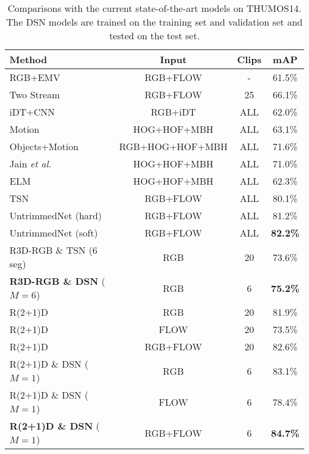 \documentclass[journal]{IEEEtran}
\begin{document}
\begin{table*}[t]
\centering
\caption{Comparisons with the current state-of-the-art models on THUMOS14. The DSN models are trained on the training set and validation set and tested on the test set.}
\begin{tabular}{l|c|c|c}
\toprule[2pt]
Method &Input &Clips& mAP \\
\hline
RGB+EMV~\cite{ZhangWW0W16}&RGB+FLOW&-& 61.5\%\\
Two Stream~\cite{SimonyanZ14}&RGB+FLOW&25& 66.1\%\\
iDT+CNN~\cite{wang2014action}&RGB+iDT&ALL&62.0\%\\
Motion~\cite{JainGS15} &HOG+HOF+MBH&ALL& 63.1\% \\
Objects+Motion~\cite{JainGS15} &RGB+HOG+HOF+MBH&ALL& 71.6\% \\
Jain \emph{et al.}~\cite{jain2014university}&HOG+HOF+MBH&ALL& 71.0\% \\
ELM~\cite{varol2014extreme} &HOG+HOF+MBH&ALL& 62.3\%\\
TSN~\cite{TSN-J}&RGB+FLOW&ALL& 80.1\%\\
UntrimmedNet (hard)~\cite{WangXLG17}  &RGB+FLOW&ALL& 81.2\%\\
UntrimmedNet (soft)~\cite{WangXLG17} &RGB+FLOW&ALL&\textbf{82.2\%}\\
\hline
R3D-RGB \& TSN (6 seg)~ &RGB& 20 & 73.6\%\\
\textbf{R3D-RGB \& DSN} ($M=6$)~ &RGB& 6&\textbf{75.2\%} \\
\hline
R(2+1)D&RGB&20& 81.9\%\\
R(2+1)D&FLOW&20& 73.5\%\\
R(2+1)D&RGB+FLOW&20& 82.6\%\\
R(2+1)D \& DSN ($M=1$)~ &RGB&6& 83.1\% \\
R(2+1)D \& DSN ($M=1$)~ &FLOW&6& 78.4\% \\
\textbf{R(2+1)D \& DSN} ($M=1$)~ &RGB+FLOW&6& \textbf{84.7\%} \\

\bottomrule[2pt]
\end{tabular}
\label{tab:state_of_the_art_thumos}
\end{table*}
\end{document}
